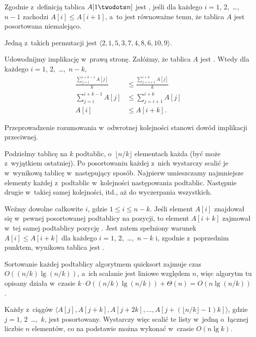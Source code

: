 
\subproblem %
Zgodnie z~definicją tablica $A[1\twodots n]$ jest , jeśli dla każdego $i=1$, 2,~\dots,~$n-1$ zachodzi $A[i]\le A[i+1]$, a~to jest równoważne temu, że tablica $A$ jest posortowana niemalejąco.

\subproblem %
Jedną z~takich permutacji jest $\langle2,1,5,3,7,4,8,6,10,9\rangle$.

\subproblem %
Udowodnijmy implikację w~prawą stronę. Załóżmy, że tablica $A$ jest . Wtedy dla każdego $i=1$, 2,~\dots,~$n-k$,
\begin{align*}
	\frac{\sum_{j=i}^{i+k-1}A[j]}{k} &\le \frac{\sum_{j=i+1}^{i+k}A[j]}{k} \\[1mm]
	\sum_{j=i}^{i+k-1}A[j] &\le \sum_{j=i+1}^{i+k}A[j] \\[1mm]
	A[i] &\le A[i+k].
\end{align*}

Przeprowadzenie rozumowania w~odwrotnej kolejności stanowi dowód implikacji przeciwnej.

\subproblem %
Podzielmy tablicę na $k$ podtablic, o~$\lfloor n/k\rfloor$ elementach każda (być może z~wyjątkiem ostatniej). Po posortowaniu każdej z~nich wystarczy scalić je w~wynikową tablicę w~następujący sposób. Najpierw umieszczamy najmniejsze elementy każdej z~podtablic w~kolejności następowania podtablic. Następnie drugie w~takiej samej kolejności, itd., aż do wyczerpania wszystkich.

Weźmy dowolne całkowite $i$, gdzie $1\le i\le n-k$. Jeśli element $A[i]$ znajdował się w~pewnej posortowanej podtablicy na  pozycji, to element $A[i+k]$ zajmował w~tej samej podtablicy pozycję . Jest zatem spełniony warunek $A[i]\le A[i+k]$ dla każdego $i=1$, 2,~\dots,~$n-k$ i, zgodnie z~poprzednim punktem, wynikowa tablica jest .

Sortowanie każdej podtablicy algorytmem quicksort zajmuje czas $O((n/k)\lg(n/k))$, a~ich scalanie jest liniowe względem $n$, więc algorytm tu opisany działa w~czasie $k\cdot O((n/k)\lg(n/k))+\Theta(n)=O(n\lg(n/k))$.

\subproblem %
Każdy z~ciągów $\bigl\langle A[j],A[j+k],A[j+2k],\dots,A[j+(\lfloor n/k\rfloor-1)k]\bigr\rangle$, gdzie $j=1$, 2~\dots,~$k$, jest posortowany. Wystarczy więc scalić te listy w~jedną o~łącznej liczbie $n$ elementów, co na podstawie  można wykonać w~czasie $O(n\lg k)$.

